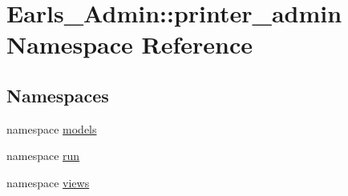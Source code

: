 \hypertarget{namespaceEarls__Admin_1_1printer__admin}{
\section{Earls\_\-Admin::printer\_\-admin Namespace Reference}
\label{namespaceEarls__Admin_1_1printer__admin}
}


\subsection*{Namespaces}
\begin{CompactItemize}
\item 
namespace \hyperlink{namespaceEarls__Admin_1_1printer__admin_1_1models}{models}
\item 
namespace \hyperlink{namespaceEarls__Admin_1_1printer__admin_1_1run}{run}
\item 
namespace \hyperlink{namespaceEarls__Admin_1_1printer__admin_1_1views}{views}
\end{CompactItemize}
